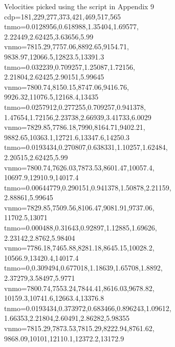 Velocities picked using the script in Appendix 9\\

cdp=181,229,277,373,421,469,517,565 \ \\
tnmo=0.0128956,0.618988,1.35404,1.69577,\\
2.22449,2.62425,3.63656,5.99 \ \\
vnmo=7815.29,7757.06,8892.65,9154.71,\\
9838.97,12066.5,12823.5,13391.3 \ \\
tnmo=0.032239,0.709257,1.25087,1.72156,\\
2.21804,2.62425,2.90151,5.99645 \ \\
vnmo=7800.74,8150.15,8747.06,9416.76,\\
9926.32,11076.5,12168.4,13435 \ \\
tnmo=0.0257912,0.277255,0.709257,0.941378,\\
1.47654,1.72156,2.23738,2.66939,3.41733,6.0029 \ \\
vnmo=7829.85,7786.18,7990,8164.71,9402.21,\\
9882.65,10363.1,12721.6,13347.6,14250.3 \ \\
tnmo=0.0193434,0.270807,0.638331,1.10257,1.62484,\\
2.20515,2.62425,5.99 \ \\
vnmo=7800.74,7626.03,7873.53,8601.47,10057.4,\\
10697.9,12910.9,14017.4 \ \\
tnmo=0.00644779,0.290151,0.941378,1.50878,2.21159,\\
2.88861,5.99645 \ \\
vnmo=7829.85,7509.56,8106.47,9081.91,9737.06,\\
11702.5,13071 \ \\
tnmo=0.000488,0.31643,0.92897,1.12885,1.69626,\\
2.23142,2.8762,5.98404 \ \\
vnmo=7786.18,7465.88,8281.18,8645.15,10028.2,\\
10566.9,13420.4,14017.4 \ \\
tnmo=0,0.309494,0.677018,1.18639,1.65708,1.8892,\\
2.37279,3.58497,5.9771 \ \\
vnmo=7800.74,7553.24,7844.41,8616.03,9678.82,\\
10159.3,10741.6,12663.4,13376.8 \ \\
tnmo=0.0193434,0.373972,0.683466,0.896243,1.09612,\\
1.66353,2.21804,2.60491,2.86282,5.98355 \ \\
vnmo=7815.29,7873.53,7815.29,8222.94,8761.62,\\
9868.09,10101,12110.1,12372.2,13172.9 \ \\